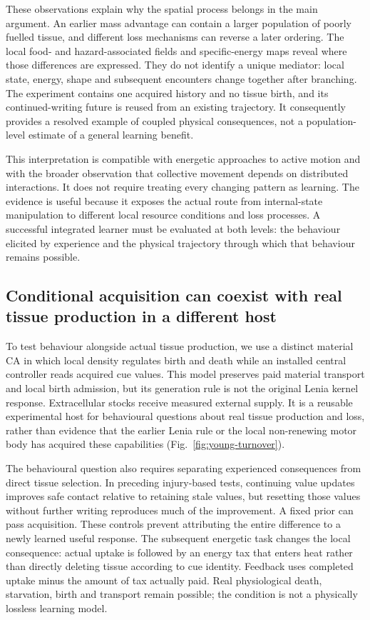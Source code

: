 

These observations explain why the spatial process belongs in the main argument. An earlier mass advantage can contain a larger population of poorly fuelled tissue, and different loss mechanisms can reverse a later ordering. The local food- and hazard-associated fields and specific-energy maps reveal where those differences are expressed. They do not identify a unique mediator: local state, energy, shape and subsequent encounters change together after branching. The experiment contains one acquired history and no tissue birth, and its continued-writing future is reused from an existing trajectory. It consequently provides a resolved example of coupled physical consequences, not a population-level estimate of a general learning benefit.

This interpretation is compatible with energetic approaches to active motion\cite{schweitzer,circle,tjhung} and with the broader observation that collective movement depends on distributed interactions\cite{tonertu}. It does not require treating every changing pattern as learning. The evidence is useful because it exposes the actual route from internal-state manipulation to different local resource conditions and loss processes. A successful integrated learner must be evaluated at both levels: the behaviour elicited by experience and the physical trajectory through which that behaviour remains possible.

\subsection*{Conditional acquisition can coexist with real tissue production in a different host}

To test behaviour alongside actual tissue production, we use a distinct material CA in which local density regulates birth and death while an installed central controller reads acquired cue values. This model preserves paid material transport and local birth admission, but its generation rule is not the original Lenia kernel response. Extracellular stocks receive measured external supply. It is a reusable experimental host for behavioural questions about real tissue production and loss, rather than evidence that the earlier Lenia rule or the local non-renewing motor body has acquired these capabilities (Fig.~\ref{fig:young-turnover}).

The behavioural question also requires separating experienced consequences from direct tissue selection. In preceding injury-based tests, continuing value updates improves safe contact relative to retaining stale values, but resetting those values without further writing reproduces much of the improvement. A fixed prior can pass acquisition. These controls prevent attributing the entire difference to a newly learned useful response. The subsequent energetic task changes the local consequence: actual uptake is followed by an energy tax that enters heat rather than directly deleting tissue according to cue identity. Feedback uses completed uptake minus the amount of tax actually paid. Real physiological death, starvation, birth and transport remain possible; the condition is not a physically lossless learning model.

